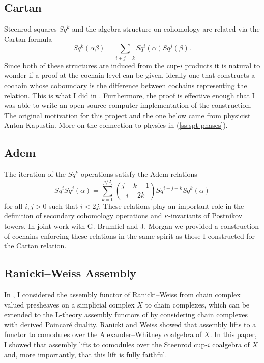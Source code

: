 \subsection{Cartan} \label{ss:cartan}

Steenrod squares $Sq^k$ and the algebra structure on cohomology are related via the Cartan formula
\begin{equation*}
Sq^k(\alpha \beta) = \sum_{i+j=k} Sq^i(\alpha) Sq^j(\beta).
\end{equation*}
Since both of these structures are induced from the cup-$i$ products it is natural to wonder if a proof at the cochain level can be given, ideally one that constructs a cochain whose coboundary is the difference between cochains representing the relation.
This is what I did in \cite{medina2020cartan}.
Furthermore, the proof is effective enough that I was able to write an open-source computer implementation of the construction.
The original motivation for this project and the one below came from physicist Anton Kapustin.
More on the connection to physics in (\cref{ss:spt phases}).

\subsection{Adem} \label{ss:adem}

The iteration of the $Sq^k$ operations satisfy the Adem relations
\begin{equation*}
Sq^i Sq^j(\alpha) = \sum_{k=0}^{\lfloor i/2 \rfloor} \binom{j-k-1}{i-2k} Sq^{i+j-k} Sq^k(\alpha)
\end{equation*}
for all $i,j > 0$ such that $i < 2j$.
These relations play an important role in the definition of secondary cohomology operations and $\kappa$-invariants of Postnikov towers.
In joint work with G. Brumfiel and J. Morgan \cite{medina2021adem} we provided a construction of cochains enforcing these relations in the same spirit as those I constructed for the Cartan relation.

\subsection{Ranicki--Weiss Assembly}

In \cite{medina2022assembly}, I considered the assembly functor of Ranicki--Weiss \cite{ranicki1990assembly} from chain complex valued presheaves on a simplicial complex $X$ to chain complexes, which can be extended to the L-theory assembly functors of \cite{ranicki1992topological} by considering chain complexes with derived Poincar\'e duality.
Ranicki and Weiss showed that assembly lifts to a functor to comodules over the Alexander--Whitney coalgebra of $X$.
In this paper, I showed that assembly lifts to comodules over the Steenrod cup-$i$ coalgebra of $X$ and, more importantly, that this lift is fully faithful.

